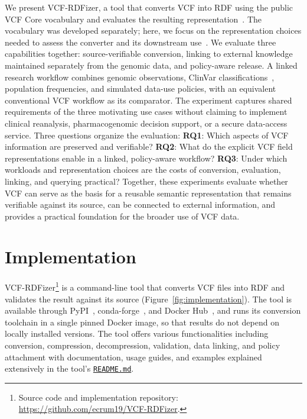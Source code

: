 \documentclass[pdflatex,sn-mathphys-num]{sn-jnl}
\begin{document}
We present VCF-RDFizer, a tool that converts VCF into RDF using the public VCF Core vocabulary and evaluates the resulting representation~\cite{vcfc210}.
The vocabulary was developed separately; here, we focus on the representation choices needed to assess the converter and its downstream use~\cite{crum_vcfcore_2027}.
We evaluate three capabilities together: source-verifiable conversion, linking to external knowledge maintained separately from the genomic data, and policy-aware release.
A linked research workflow combines genomic observations, ClinVar classifications~\cite{landrum2018clinvar}, population frequencies, and simulated data-use policies, with an equivalent conventional VCF workflow as its comparator.
The experiment captures shared requirements of the three motivating use cases without claiming to implement clinical reanalysis, pharmacogenomic decision support, or a secure data-access service.
Three questions organize the evaluation:
\textbf{RQ1}: Which aspects of VCF information are preserved and verifiable?
\textbf{RQ2}: What do the explicit VCF field representations enable in a linked, policy-aware workflow?
\textbf{RQ3}: Under which workloads and representation choices are the costs of conversion, evaluation, linking, and querying practical?
Together, these experiments evaluate whether VCF can serve as the basis for a reusable semantic representation that remains verifiable against its source, can be connected to external information, and provides a practical foundation for the broader use of VCF data.

\section{Implementation}\label{sec:implementation}
VCF-RDFizer\footnote{Source code and implementation repository: \url{https://github.com/ecrum19/VCF-RDFizer}.} is a command-line tool that converts VCF files into RDF and validates the result against its source (Figure~\ref{fig:implementation}).
The tool is available through PyPI~\cite{vcfrdfizer_pypi}, conda-forge~\cite{vcfrdfizer_conda}, and Docker Hub~\cite{vcfrdfizer_docker}, and runs its conversion toolchain in a single pinned Docker image, so that results do not depend on locally installed versions.
The tool offers various functionalities including conversion, compression, decompression, validation, data linking, and policy attachment with documentation, usage guides, and examples explained extensively in the tool's \href{https://github.com/ecrum19/VCF-RDFizer/blob/main/README.md}{\texttt{README.md}}.
\end{document}
